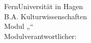 \makeatletter
\begin{small}
	\noindent
	FernUniversität in Hagen \hfill \@date\\
	B.A. Kulturwissenschaften\\
	Modul „\modul“\\
	Modulverantwortlicher: \modulverantwortlicher\\
	\@author
	\vspace*{.5cm}
	
	\noindent
	\textbf{\@title}
	\vspace*{.2cm}
	
\end{small}
